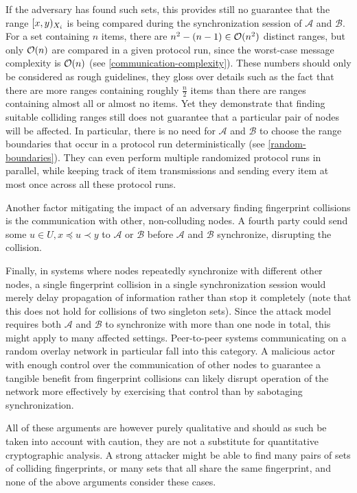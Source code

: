 \label{why-random-boundaries}
If the adversary has found such sets, this provides still no guarantee that the range $[{x},{y})_{X_i}$ is being compared during the synchronization session of $\mathcal{A}$ and $\mathcal{B}$. For a set containing $n$ items, there are $n^2 - (n - 1) \in \mathcal{O}(n^2)$ distinct ranges, but only $\mathcal{O}(n)$ are compared in a given protocol run, since the worst-case message complexity is $\mathcal{O}(n)$ (see \cref{communication-complexity}). These numbers should only be considered as rough guidelines, they gloss over details such as the fact that there are more ranges containing roughly $\frac{n}{2}$ items than there are ranges containing almost all or almost no items. Yet they demonstrate that finding suitable colliding ranges still does not guarantee that a particular pair of nodes will be affected. In particular, there is no need for $\mathcal{A}$ and $\mathcal{B}$ to choose the range boundaries that occur in a protocol run deterministically (see \cref{random-boundaries}). They can even perform multiple randomized protocol runs in parallel, while keeping track of item transmissions and sending every item at most once across all these protocol runs.

Another factor mitigating the impact of an adversary finding fingerprint collisions is the communication with other, non-colluding nodes. A fourth party could send some $u \in U, x \preceq u \prec y$ to $\mathcal{A}$ or $\mathcal{B}$ before $\mathcal{A}$ and $\mathcal{B}$ synchronize, disrupting the collision.

Finally, in systems where nodes repeatedly synchronize with different other nodes, a single fingerprint collision in a single synchronization session would merely delay propagation of information rather than stop it completely (note that this does not hold for collisions of two singleton sets). Since the attack model requires both $\mathcal{A}$ and $\mathcal{B}$ to synchronize with more than one node in total, this might apply to many affected settings. Peer-to-peer systems communicating on a random overlay network in particular fall into this category. A malicious actor with enough control over the communication of other nodes to guarantee a tangible benefit from fingerprint collisions can likely disrupt operation of the network more effectively by exercising that control than by sabotaging synchronization.

All of these arguments are however purely qualitative and should as such be taken into account with caution, they are not a substitute for quantitative cryptographic analysis. A strong attacker might be able to find many pairs of sets of colliding fingerprints, or many sets that all share the same fingerprint, and none of the above arguments consider these cases.

